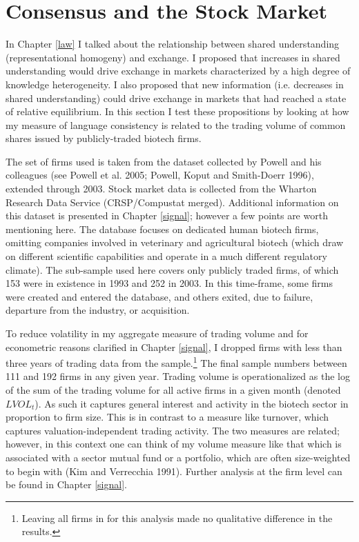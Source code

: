  
\section{Consensus and the Stock Market}

In Chapter \ref{law} I talked about the relationship between shared understanding (representational homogeny) and exchange.  I proposed that increases in shared understanding would drive exchange in markets characterized by a high degree of knowledge heterogeneity. I also proposed that new information (i.e. decreases in shared understanding) could drive exchange in markets that had reached a state of relative equilibrium. In this section I test these propositions by looking at how my measure of language consistency is related to the trading volume of common shares issued by publicly-traded biotech firms.

The set of firms used is taken from the dataset collected by Powell and his colleagues (see Powell et al. 2005; Powell, Koput and Smith-Doerr 1996), extended through 2003. Stock market data is collected from the Wharton Research Data Service (CRSP/Compustat merged). Additional information on this dataset is presented in Chapter \ref{signal}; however a few points are worth mentioning here. The database focuses on dedicated human biotech firms, omitting companies involved in veterinary and agricultural biotech (which draw on different scientific capabilities and operate in a much different regulatory climate). The sub-sample used here covers only publicly traded firms, of which 153 were in existence in 1993 and 252 in 2003. In this time-frame, some firms were created and entered the database, and others exited, due to failure, departure from the industry, or acquisition. 

To reduce volatility in my aggregate measure of trading volume and for econometric reasons clarified in Chapter \ref{signal}, I dropped firms with less than three years of trading data from the sample.\footnote{Leaving all firms in for this analysis made no qualitative difference in the results.} The final sample numbers between 111 and 192 firms in any given year. Trading volume is operationalized as the log of the sum of the trading volume for all active firms in a given month (denoted $LVOL_t$). As such it captures general interest and activity in the biotech sector in proportion to firm size. This is in contrast to a measure like turnover, which captures valuation-independent trading activity. The two measures are related; however, in this context one can think of my volume measure like that which is associated with a sector mutual fund or a portfolio, which are often size-weighted to begin with (Kim and Verrecchia 1991). Further analysis at the firm level can be found in Chapter \ref{signal}.

